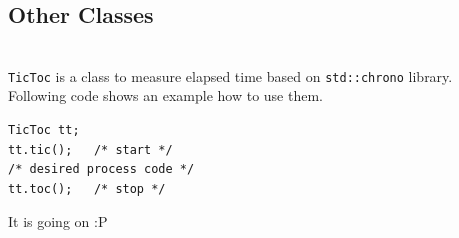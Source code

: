 \documentclass[a4paper]{amsart}
\begin{document}
\subsection{Other Classes}
~ \\
{\tt\small TicToc} is a class to measure elapsed time based on {\tt\small std::chrono} library. Following code shows an example how to use them.
\begin{lstlisting}[basicstyle=\footnotesize\ttfamily]
TicToc tt;
tt.tic();   /* start */
/* desired process code */
tt.toc();   /* stop */

\end{lstlisting}











{\color{red} It is going on :P }

%
%


\newpage

\printbibliography
\end{document}
